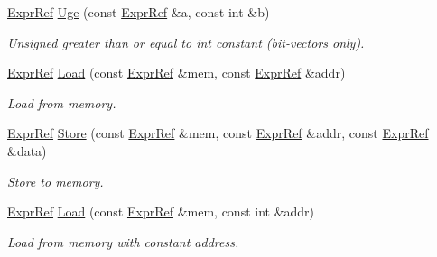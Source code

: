 \begin{DoxyCompactItemize}
\mbox{\label{namespaceilang_abb2e13c0f75065c992879b4599f0ec5c}} 
\mbox{\hyperlink{classilang_1_1_expr_ref}{Expr\+Ref}} \mbox{\hyperlink{namespaceilang_abb2e13c0f75065c992879b4599f0ec5c}{Uge}} (const \mbox{\hyperlink{classilang_1_1_expr_ref}{Expr\+Ref}} \&a, const int \&b)
\begin{DoxyCompactList}\small\item\em Unsigned greater than or equal to int constant (bit-\/vectors only). \end{DoxyCompactList}\item 
\mbox{\label{namespaceilang_a1f4006e3000db73b20ee6f06a713d1bd}} 
\mbox{\hyperlink{classilang_1_1_expr_ref}{Expr\+Ref}} \mbox{\hyperlink{namespaceilang_a1f4006e3000db73b20ee6f06a713d1bd}{Load}} (const \mbox{\hyperlink{classilang_1_1_expr_ref}{Expr\+Ref}} \&mem, const \mbox{\hyperlink{classilang_1_1_expr_ref}{Expr\+Ref}} \&addr)
\begin{DoxyCompactList}\small\item\em Load from memory. \end{DoxyCompactList}\item 
\mbox{\label{namespaceilang_ad32b36b718a94a19184be0eaa66e5774}} 
\mbox{\hyperlink{classilang_1_1_expr_ref}{Expr\+Ref}} \mbox{\hyperlink{namespaceilang_ad32b36b718a94a19184be0eaa66e5774}{Store}} (const \mbox{\hyperlink{classilang_1_1_expr_ref}{Expr\+Ref}} \&mem, const \mbox{\hyperlink{classilang_1_1_expr_ref}{Expr\+Ref}} \&addr, const \mbox{\hyperlink{classilang_1_1_expr_ref}{Expr\+Ref}} \&data)
\begin{DoxyCompactList}\small\item\em Store to memory. \end{DoxyCompactList}\item 
\mbox{\label{namespaceilang_a3aa9ea7950a14ee2aeee819185b552b5}} 
\mbox{\hyperlink{classilang_1_1_expr_ref}{Expr\+Ref}} \mbox{\hyperlink{namespaceilang_a3aa9ea7950a14ee2aeee819185b552b5}{Load}} (const \mbox{\hyperlink{classilang_1_1_expr_ref}{Expr\+Ref}} \&mem, const int \&addr)
\begin{DoxyCompactList}\small\item\em Load from memory with constant address. \end{DoxyCompactList}\item 
\mbox{\label{namespaceilang_ab9db91d7f135f2abb8b3aee379850c01}} 

\end{DoxyCompactItemize}
